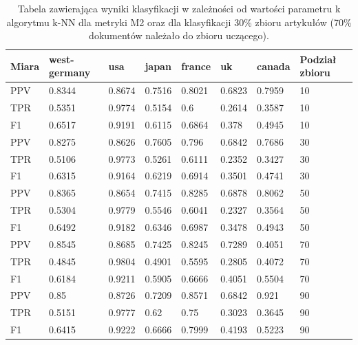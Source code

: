 \documentclass{classrep}
\begin{document}
\begin{table}[H]
    \centering
\caption{Tabela zawierająca wyniki klasyfikacji w zależności od wartości parametru k algorytmu k-NN dla metryki M2 oraz dla klasyfikacji 30\% zbioru artykułów (70\% dokumentów należało do zbioru uczącego).}
\begin{adjustbox}{max width=\textwidth}
    \begin{tabular}{|l|l|l|l|l|l|l|l|}
    \hline
        Miara & west-germany  & usa  & japan & france & uk & canada & Podział zbioru \\ \hline
        PPV & 0.8344 & 0.8674 & 0.7516 & 0.8021 & 0.6823 & 0.7959 & 10 \\ \hline
        TPR & 0.5351 & 0.9774 & 0.5154 & 0.6 & 0.2614 & 0.3587 & 10 \\ \hline
        F1 & 0.6517 & 0.9191 & 0.6115 & 0.6864 & 0.378 & 0.4945 & 10 \\ \hline
        PPV & 0.8275 & 0.8626 & 0.7605 & 0.796 & 0.6842 & 0.7686 & 30 \\ \hline
        TPR & 0.5106 & 0.9773 & 0.5261 & 0.6111 & 0.2352 & 0.3427 & 30 \\ \hline
        F1 & 0.6315 & 0.9164 & 0.6219 & 0.6914 & 0.3501 & 0.4741 & 30 \\ \hline
        PPV & 0.8365 & 0.8654 & 0.7415 & 0.8285 & 0.6878 & 0.8062 & 50 \\ \hline
        TPR & 0.5304 & 0.9779 & 0.5546 & 0.6041 & 0.2327 & 0.3564 & 50 \\ \hline
        F1 & 0.6492 & 0.9182 & 0.6346 & 0.6987 & 0.3478 & 0.4943 & 50 \\ \hline
        PPV & 0.8545 & 0.8685 & 0.7425 & 0.8245 & 0.7289 & 0.4051 & 70 \\ \hline
        TPR & 0.4845 & 0.9804 & 0.4901 & 0.5595 & 0.2805 & 0.4072 & 70 \\ \hline
        F1 & 0.6184 & 0.9211 & 0.5905 & 0.6666 & 0.4051 & 0.5504 & 70 \\ \hline
        PPV & 0.85 & 0.8726 & 0.7209 & 0.8571 & 0.6842 & 0.921 & 90 \\ \hline
        TPR & 0.5151 & 0.9777 & 0.62 & 0.75 & 0.3023 & 0.3645 & 90 \\ \hline
        F1 & 0.6415 & 0.9222 & 0.6666 & 0.7999 & 0.4193 & 0.5223 & 90 \\ \hline
    \end{tabular}
\end{adjustbox}
\end{table}
\end{document}
